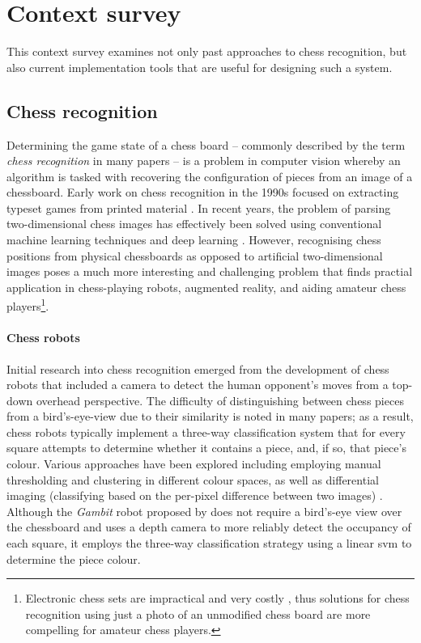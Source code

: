 \section{Context survey}
This context survey examines not only past approaches to chess recognition, but also current implementation tools that are useful for designing such a system.

\subsection{Chess recognition}
\label{sec:context_survey_chess_recognition}
Determining the game state of a chess board -- commonly described by the term \emph{chess recognition} in many papers -- is a problem in computer vision whereby an algorithm is tasked with recovering the configuration of pieces from an image of a chessboard.
Early work on chess recognition in the 1990s focused on extracting typeset games from printed material \cite{baird1990}. 
In recent years, the problem of parsing two-dimensional chess images has effectively been solved using conventional machine learning techniques \cite{khater2012} and deep learning \cite{sameer2020,roy2020}.
However, recognising chess positions from physical chessboards as opposed to artificial two-dimensional images poses a much more interesting and challenging problem that finds practial application in chess-playing robots, augmented reality, and aiding amateur chess players\footnote{Electronic chess sets are impractical and very costly \cite{wang2013}, thus solutions for chess recognition using just a photo of an unmodified chess board are more compelling for amateur chess players.}.

\paragraph{Chess robots}
Initial research into chess recognition emerged from the development of chess robots that included a camera to detect the human opponent's moves from a top-down overhead perspective. 
The difficulty of distinguishing between chess pieces from a bird's-eye-view due to their similarity is noted in many papers; as a result, chess robots typically implement a three-way classification system that for every square attempts to determine whether it contains a piece, and, if so, that piece's colour.
Various approaches have been explored including
  employing manual thresholding \cite{cour2002,urting2003,banerjee2012,chen2016} and clustering \cite{goncalves2005} in different colour spaces, as well as
  differential imaging (classifying based on the per-pixel difference between two images) \cite{khan2014,chen2019}.
Although the \emph{Gambit} robot proposed by \textcite{matuszek2011} does not require a bird's-eye view over the chessboard and uses a depth camera to more reliably detect the occupancy of each square, it employs the three-way classification strategy using a linear \gls{svm} to determine the piece colour. 


